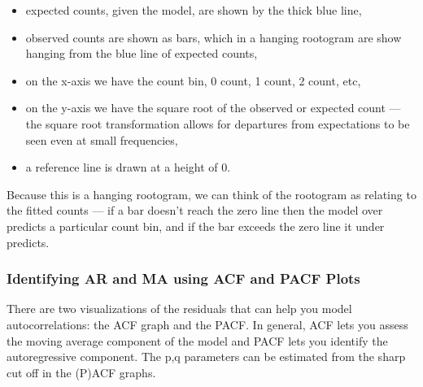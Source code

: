 \documentclass[
]{book}
\newenvironment{Shaded}{\begin{snugshade}}{\end{snugshade}}
\newcommand{\AttributeTok}[1]{\textcolor[rgb]{0.77,0.63,0.00}{#1}}
\newcommand{\DecValTok}[1]{\textcolor[rgb]{0.00,0.00,0.81}{#1}}
\newcommand{\FunctionTok}[1]{\textcolor[rgb]{0.00,0.00,0.00}{#1}}
\newcommand{\NormalTok}[1]{#1}
\newcommand{\SpecialCharTok}[1]{\textcolor[rgb]{0.00,0.00,0.00}{#1}}
\newcommand{\StringTok}[1]{\textcolor[rgb]{0.31,0.60,0.02}{#1}}
\providecommand{\tightlist}{%
  \setlength{\itemsep}{0pt}\setlength{\parskip}{0pt}}
\begin{document}
\begin{itemize}
\tightlist
\item
  expected counts, given the model, are shown by the thick blue line,
\item
  observed counts are shown as bars, which in a hanging rootogram are show hanging from the blue line of expected counts,
\item
  on the x-axis we have the count bin, 0 count, 1 count, 2 count, etc,
\item
  on the y-axis we have the square root of the observed or expected count --- the square root transformation allows for departures from expectations to be seen even at small frequencies,
\item
  a reference line is drawn at a height of 0.
\end{itemize}

Because this is a hanging rootogram, we can think of the rootogram as relating to the fitted counts --- if a bar doesn't reach the zero line then the model over predicts a particular count bin, and if the bar exceeds the zero line it under predicts.

\hypertarget{ACF}{%
\subsubsection{Identifying AR and MA using ACF and PACF Plots}\label{ACF}}

There are two visualizations of the residuals that can help you model autocorrelations: the ACF graph and the PACF. In general, ACF lets you assess the moving average component of the model and PACF lets you identify the autoregressive component. The p,q parameters can be estimated from the sharp cut off in the (P)ACF graphs.

\begin{Shaded}
\end{Shaded}
\end{document}
